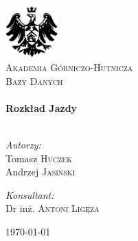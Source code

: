 \begin{titlepage}

\begin{center}

\includegraphics[width=0.15\textwidth]{./img/logo.eps}\\[1cm]

\textsc{\LARGE Akademia Górniczo-Hutnicza}\\[1.5cm]

\textsc{\Large Bazy Danych}\\[0.5cm]


\HRule \\[0.4cm]
{ \huge \bfseries Rozkład Jazdy}\\[0.4cm]

\HRule \\[1.5cm]

\begin{minipage}{0.4\textwidth}
\begin{flushleft} \large
\emph{Autorzy:}\\
Tomasz \textsc{Huczek}\\
Andrzej \textsc{Jasiński}
\end{flushleft}
\end{minipage}
\begin{minipage}{0.4\textwidth}
\begin{flushright} \large
\emph{Konsultant:} \\
Dr inż. \textsc{Antoni Ligęza}
\end{flushright}
\end{minipage}

\vfill

{\large \today}

\end{center}

\end{titlepage}
